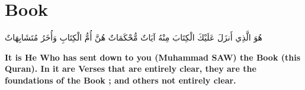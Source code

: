 \chapter{Book}
\begin{center}
    {\Huge    
        \begin{Arabic}
            هُوَ الَّذِي أَنزَلَ عَلَيْكَ الْكِتَابَ مِنْهُ آيَاتٌ مُّحْكَمَاتٌ هُنَّ أُمُّ الْكِتَابِ وَأُخَرُ مُتَشَابِهَاتٌ
        \end{Arabic}
    }    
\end{center}
\vspace*{\fill}
\vspace{3cm}
\begin{center}
    \large \textbf{It is He Who has sent down to you (Muhammad SAW) the Book (this Quran). In it are Verses that are entirely clear, they are the foundations of the Book ; and others not entirely clear. }
\end{center}
